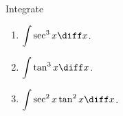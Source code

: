 Integrate 
\begin{enumerate}
\item $\displaystyle \int \sec^3x  \diff x$.
\item $\displaystyle \int \tan^3x \diff x$.
\item $\displaystyle \int \sec^2x\tan^2x \diff x$.

\end{enumerate}